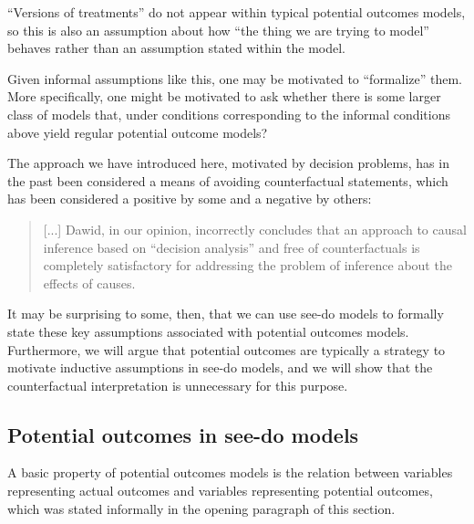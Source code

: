 ``Versions of treatments'' do not appear within typical potential outcomes models, so this is also an assumption about how ``the thing we are trying to model'' behaves rather than an assumption stated within the model.

Given informal assumptions like this, one may be motivated to ``formalize'' them. More specifically, one might be motivated to ask whether there is some larger class of models that, under conditions corresponding to the informal conditions above yield regular potential outcome models?


The approach we have introduced here, motivated by decision problems, has in the past been considered a means of avoiding counterfactual statements, which has been considered a positive by some \citep{dawid_causal_2000} and a negative by others:

\begin{quote}
[...] Dawid, in our opinion, incorrectly concludes that an approach to causal inference based on ``decision analysis'' and free of counterfactuals is completely satisfactory for addressing the problem of inference about the effects of causes.\citep{robins_causal_2000}
\end{quote}

It may be surprising to some, then, that we can use see-do models to formally state these key assumptions associated with potential outcomes models. Furthermore, we will argue that potential outcomes are typically a strategy to motivate inductive assumptions in see-do models, and we will show that the counterfactual interpretation is unnecessary for this purpose.

\subsection{Potential outcomes in see-do models}

A basic property of potential outcomes models is the relation between variables representing actual outcomes and variables representing potential outcomes, which was stated informally in the opening paragraph of this section.

